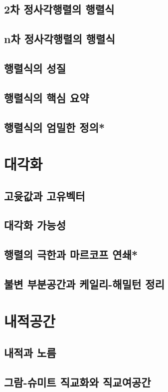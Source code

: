 \documentclass{oblivoir}
\begin{document}
\subsection{2차 정사각행렬의 행렬식}
\subsection{n차 정사각행렬의 행렬식}
\subsection{행렬식의 성질}
\subsection{행렬식의 핵심 요약}
\subsection{행렬식의 엄밀한 정의*}

\newpage
\section{대각화}
\subsection{고윳값과 고유벡터}
\subsection{대각화 가능성}
\subsection{행렬의 극한과 마르코프 연쇄*}
\subsection{불변 부분공간과 케일리-해밀턴 정리}

\newpage
\section{내적공간}
\subsection{내적과 노름}
\subsection{그람-슈미트 직교화와 직교여공간}
\end{document}

